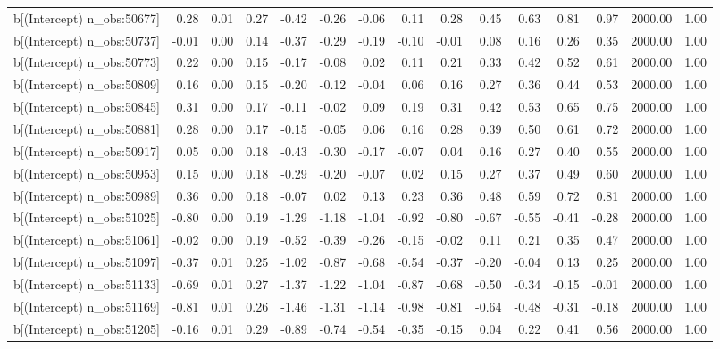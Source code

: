 \begin{table}[ht]
\begin{tabular}{rrrrrrrrrrrrrrr}
  b[(Intercept) n\_obs:50677] & 0.28 & 0.01 & 0.27 & -0.42 & -0.26 & -0.06 & 0.11 & 0.28 & 0.45 & 0.63 & 0.81 & 0.97 & 2000.00 & 1.00 \\ 
  b[(Intercept) n\_obs:50737] & -0.01 & 0.00 & 0.14 & -0.37 & -0.29 & -0.19 & -0.10 & -0.01 & 0.08 & 0.16 & 0.26 & 0.35 & 2000.00 & 1.00 \\ 
  b[(Intercept) n\_obs:50773] & 0.22 & 0.00 & 0.15 & -0.17 & -0.08 & 0.02 & 0.11 & 0.21 & 0.33 & 0.42 & 0.52 & 0.61 & 2000.00 & 1.00 \\ 
  b[(Intercept) n\_obs:50809] & 0.16 & 0.00 & 0.15 & -0.20 & -0.12 & -0.04 & 0.06 & 0.16 & 0.27 & 0.36 & 0.44 & 0.53 & 2000.00 & 1.00 \\ 
  b[(Intercept) n\_obs:50845] & 0.31 & 0.00 & 0.17 & -0.11 & -0.02 & 0.09 & 0.19 & 0.31 & 0.42 & 0.53 & 0.65 & 0.75 & 2000.00 & 1.00 \\ 
  b[(Intercept) n\_obs:50881] & 0.28 & 0.00 & 0.17 & -0.15 & -0.05 & 0.06 & 0.16 & 0.28 & 0.39 & 0.50 & 0.61 & 0.72 & 2000.00 & 1.00 \\ 
  b[(Intercept) n\_obs:50917] & 0.05 & 0.00 & 0.18 & -0.43 & -0.30 & -0.17 & -0.07 & 0.04 & 0.16 & 0.27 & 0.40 & 0.55 & 2000.00 & 1.00 \\ 
  b[(Intercept) n\_obs:50953] & 0.15 & 0.00 & 0.18 & -0.29 & -0.20 & -0.07 & 0.02 & 0.15 & 0.27 & 0.37 & 0.49 & 0.60 & 2000.00 & 1.00 \\ 
  b[(Intercept) n\_obs:50989] & 0.36 & 0.00 & 0.18 & -0.07 & 0.02 & 0.13 & 0.23 & 0.36 & 0.48 & 0.59 & 0.72 & 0.81 & 2000.00 & 1.00 \\ 
  b[(Intercept) n\_obs:51025] & -0.80 & 0.00 & 0.19 & -1.29 & -1.18 & -1.04 & -0.92 & -0.80 & -0.67 & -0.55 & -0.41 & -0.28 & 2000.00 & 1.00 \\ 
  b[(Intercept) n\_obs:51061] & -0.02 & 0.00 & 0.19 & -0.52 & -0.39 & -0.26 & -0.15 & -0.02 & 0.11 & 0.21 & 0.35 & 0.47 & 2000.00 & 1.00 \\ 
  b[(Intercept) n\_obs:51097] & -0.37 & 0.01 & 0.25 & -1.02 & -0.87 & -0.68 & -0.54 & -0.37 & -0.20 & -0.04 & 0.13 & 0.25 & 2000.00 & 1.00 \\ 
  b[(Intercept) n\_obs:51133] & -0.69 & 0.01 & 0.27 & -1.37 & -1.22 & -1.04 & -0.87 & -0.68 & -0.50 & -0.34 & -0.15 & -0.01 & 2000.00 & 1.00 \\ 
  b[(Intercept) n\_obs:51169] & -0.81 & 0.01 & 0.26 & -1.46 & -1.31 & -1.14 & -0.98 & -0.81 & -0.64 & -0.48 & -0.31 & -0.18 & 2000.00 & 1.00 \\ 
  b[(Intercept) n\_obs:51205] & -0.16 & 0.01 & 0.29 & -0.89 & -0.74 & -0.54 & -0.35 & -0.15 & 0.04 & 0.22 & 0.41 & 0.56 & 2000.00 & 1.00 \\ 

\end{tabular}
\end{table}
